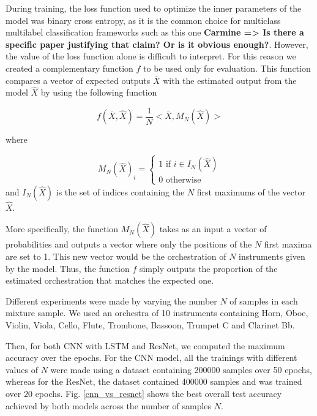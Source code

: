 \documentclass{article}
\newcommand{\carmine}[1]{\textbf{\color{red} Carmine => #1}}
\begin{document}
During training, the loss function used to optimize the inner parameters of the model was binary cross entropy, as it is the common choice for multiclass multilabel classification frameworks such as this one \carmine{Is there a specific paper justifying that claim? Or is it obvious enough?}. However, the value of the loss function alone is difficult to interpret. For this reason we created a complementary function $f$ to be used only for evaluation. This function compares a vector of expected outputs $\overline{X}$ with the estimated output from the model $\hat{X}$ by using the following function

\begin{equation}
f(\overline{X}, \hat{X}) = \frac{1}{N}<\overline{X}, M_N(\hat{X})>
\label{eval}
\end{equation}

where

\begin{equation}
M_N(\hat{X})_i = \left\{\begin{array}{ll}
1 \text{ if } i \in I_N(\hat{X})\\
0 \text{ otherwise}
\end{array}\right.
\label{NMax}
\end{equation}
and $I_N(\hat{X})$ is the set of indices containing the $N$ first maximums of the vector $\hat{X}$.

More specifically, the function $M_N(\hat{X})$ takes as an input a vector of probabilities and outputs a vector where only the positions of the $N$ first maxima are set to 1. This new vector would be the orchestration of $N$ instruments given by the model. Thus, the function $f$ simply outputs the proportion of the estimated orchestration that matches the expected one.

Different experiments were made by varying the number $N$ of samples in each mixture sample. We used an orchestra of 10 instruments containing Horn, Oboe, Violin, Viola, Cello, Flute, Trombone, Bassoon, Trumpet C and Clarinet Bb.

Then, for both CNN with LSTM and ResNet, we computed the maximum accuracy over the epochs. For the CNN model, all the trainings with different values of $N$ were made using a dataset containing 200000 samples over 50 epochs, whereas for the ResNet, the dataset contained 400000 samples and was trained over 20 epochs. Fig. \ref{cnn_vs_resnet} shows the best overall test accuracy achieved by both models across the number of samples $N$.\\
\end{document}
